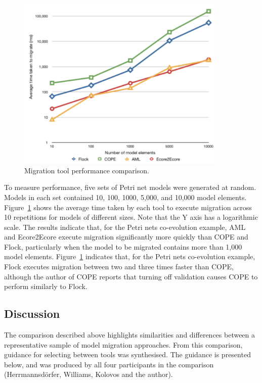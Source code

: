 \begin{figure}[htbp]
	\centering
	\includegraphics[width=10cm]{6.Evaluation/images/migration_tool_performance.pdf}
	\caption{Migration tool performance comparison.}
	\label{fig:performance}
\end{figure}

To measure performance, five sets of Petri net models were generated at random. Models in each set contained 10, 100, 1000, 5,000, and 10,000 model elements.  Figure~\ref{fig:performance} shows the average time taken by each tool to execute migration across 10 repetitions for models of different sizes. Note that the Y axis has a logarithmic scale. The results indicate that, for the Petri nets co-evolution example, AML and Ecore2Ecore execute migration significantly more quickly than COPE and Flock, particularly when the model to be migrated contains more than 1,000 model elements. Figure~\ref{fig:performance} indicates that, for the Petri nets co-evolution example, Flock executes migration between two and three times faster than COPE, although the author of COPE reports that turning off validation causes COPE to perform similarly to Flock.


\subsection{Discussion}
\label{sec:discussion}
The comparison described above highlights similarities and differences between a representative sample of model migration approaches. From this comparison, guidance for selecting between tools was synthesised. The guidance is presented below, and was produced by all four participants in the comparison (Herrmannsd\"{o}rfer, Williams, Kolovos and the author). 

